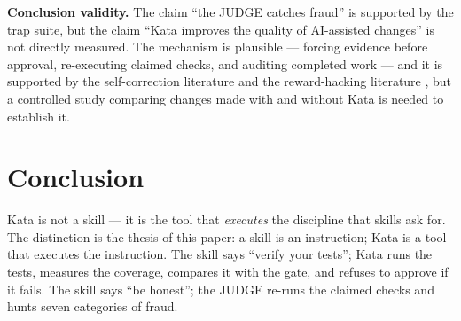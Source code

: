 \documentclass[11pt]{article}
\begin{document}
\textbf{Conclusion validity.} The claim ``the JUDGE catches fraud'' is
supported by the trap suite, but the claim ``Kata improves the quality of
AI-assisted changes'' is not directly measured. The mechanism is
plausible --- forcing evidence before approval, re-executing claimed
checks, and auditing completed work --- and it is supported by the
self-correction literature \cite{selfcorrect} and the reward-hacking
literature \cite{specbench}, but a controlled study comparing changes made
with and without Kata is needed to establish it.

\section{Conclusion}
\label{sec:conclusion}

Kata is not a skill --- it is the tool that \emph{executes} the discipline
that skills ask for. The distinction is the thesis of this paper: a skill
is an instruction; Kata is a tool that executes the instruction. The skill
says ``verify your tests''; Kata runs the tests, measures the coverage,
compares it with the gate, and refuses to approve if it fails. The skill
says ``be honest''; the JUDGE re-runs the claimed checks and hunts seven
categories of fraud.
\end{document}
